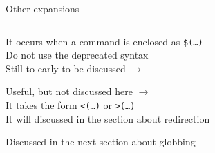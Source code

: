 \begin{frame}{Other expansions}
    \vspace{-8mm}
    \begin{columns}
        \begin{column}{\dimexpr\paperwidth-10mm}
            \begin{center}
                \large{}
            \end{center}
            \begin{description}
                \setlength{\itemsep}{3mm}
                \item[Command substitution:]
                    It occurs when a command is enclosed as \alert{\texttt{\$(\ldots)}}\\
                    Do not use the deprecated syntax \\
                    Still to early to be discussed $\to$ \\
                \item[Process substitution:]
                    Useful, but not discussed here $\to$ \\
                    It takes the form \alert{\texttt{<(\ldots)}} or \alert{\texttt{>(\ldots)}}\\
                    It will discussed in the section about redirection
            \end{description}
            \vspace{2mm}
            \begin{center}
                \large{}
            \end{center}
            \begin{description}%
                \item[Filename expansion:]
                    Discussed in the next section about globbing
            \end{description}
        \end{column}
    \end{columns}
\end{frame}
